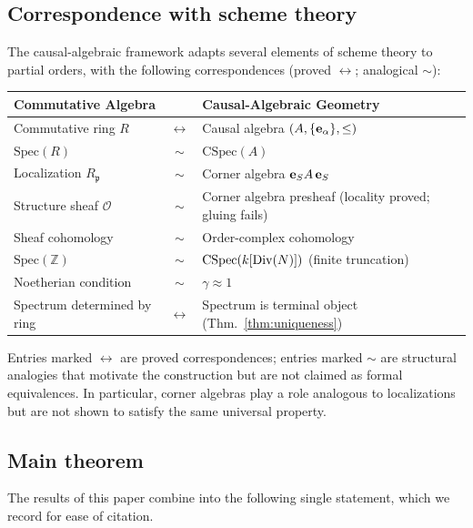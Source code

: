\documentclass[11pt,a4paper]{article}
\theoremstyle{plain}
\theoremstyle{definition}
\theoremstyle{remark}
\newcommand{\CSpec}{\mathrm{CSpec}}
\newcommand{\Spec}{\mathrm{Spec}}
\newcommand{\Z}{\mathbb{Z}}
\begin{document}
\subsection{Correspondence with scheme theory}

The causal-algebraic framework adapts several elements of scheme theory to partial orders, with the following correspondences (proved $\longleftrightarrow$; analogical $\sim$):

\medskip
\begin{center}
\begin{tabular}{lcl}
\toprule
Commutative Algebra & & Causal-Algebraic Geometry \\
\midrule
Commutative ring $R$ & $\longleftrightarrow$ & Causal algebra $(A, \{{\bf e}_\alpha\}, \leq)$ \\
$\Spec(R)$ & $\sim$ & $\CSpec(A)$ \\
Localization $R_{\mathfrak{p}}$& $\sim$ & Corner algebra ${\bf e}_S A\, {\bf e}_S$ \\
Structure sheaf $\mathcal{O}$ & $\sim$ & Corner algebra presheaf (locality proved; gluing fails) \\
Sheaf cohomology & $\sim$ & Order-complex cohomology \\
$\Spec(\Z)$ & $\sim$ & $\CSpec(k[{\rm Div}(N)])$ (finite truncation) \\
Noetherian condition & $\sim$ & $\gamma \approx 1$ \\
Spectrum determined by ring & $\longleftrightarrow$ & Spectrum is terminal object (Thm.~\ref{thm:uniqueness}) \\
\bottomrule
\end{tabular}
\end{center}
\medskip

\noindent Entries marked $\longleftrightarrow$ are proved
correspondences; entries marked $\sim$ are structural analogies
that motivate the construction but are not claimed as formal
equivalences. In particular, corner algebras play a role analogous
to localizations but are not shown to satisfy the same universal
property.


\subsection{Main theorem}

The results of this paper combine into the following single statement, which we record for ease of citation.
\end{document}
